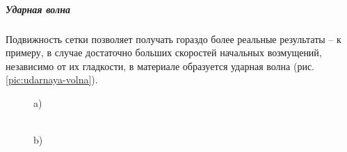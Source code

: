 \subparagraph{Ударная волна}
Подвижность сетки позволяет получать гораздо более реальные результаты -- к примеру, в случае достаточно больших скоростей начальных возмущений, независимо от их гладкости, в материале образуется ударная волна (рис.\ref{pic:udarnaya-volna}).

\begin{figure}
\begin{minipage}[h]{0.47\linewidth}
 a) \\
\end{minipage}
\hfill
\begin{minipage}[h]{0.47\linewidth}
 \\b)

\end{minipage}
\end{figure}
